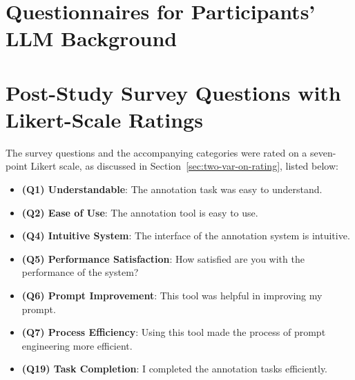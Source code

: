 
% 


\section{Questionnaires for Participants' LLM Background}\label{sec:appendix=participant-background}



\section{Post-Study Survey Questions with Likert-Scale Ratings\label{app:two-var-on-rating}}

The survey questions and the accompanying categories were rated on a seven-point Likert scale, 
as discussed in 
Section~\ref{sec:two-var-on-rating},
listed below:

\begin{itemize}
    \item 
    \textbf{(Q1) Understandable}: The annotation task was easy to understand.

    \item
    \textbf{(Q2) Ease of Use}: The annotation tool is easy to use.

    \item
    \textbf{(Q4) Intuitive System}: The interface of the annotation system is intuitive.

    \item
    \textbf{(Q5) Performance Satisfaction}: How satisfied are you with the performance of the system?

    \item
    \textbf{(Q6) Prompt Improvement}: This tool was helpful in improving my prompt. 
    
    \item
    \textbf{(Q7) Process Efficiency}: Using this tool made the process of prompt engineering more efficient.

    \item
    \textbf{(Q19) Task Completion}: I completed the annotation tasks efficiently.

\end{itemize}